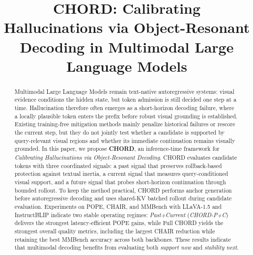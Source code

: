 \documentclass[sigconf,anonymous]{acmart}
\begin{document}
\title[CHORD]{CHORD: Calibrating Hallucinations via Object-Resonant Decoding in Multimodal Large Language Models}



\renewcommand{\shortauthors}{Anonymous Submission}

\begin{abstract}
Multimodal Large Language Models remain text-native autoregressive systems: visual evidence conditions the hidden state, but token admission is still decided one step at a time. Hallucination therefore often emerges as a short-horizon decoding failure, where a locally plausible token enters the prefix before robust visual grounding is established. Existing training-free mitigation methods mainly penalize historical failures or rescore the current step, but they do not jointly test whether a candidate is supported by query-relevant visual regions and whether its immediate continuation remains visually grounded. In this paper, we propose \textbf{CHORD}, an inference-time framework for \emph{Calibrating Hallucinations via Object-Resonant Decoding}. CHORD evaluates candidate tokens with three coordinated signals: a past signal that preserves rollback-based protection against textual inertia, a current signal that measures query-conditioned visual support, and a future signal that probes short-horizon continuation through bounded rollout. To keep the method practical, CHORD performs anchor generation before autoregressive decoding and uses shared-KV batched rollout during candidate evaluation. Experiments on POPE, CHAIR, and MMBench with LLaVA-1.5 and InstructBLIP indicate two stable operating regimes: \textit{Past+Current} (\textit{CHORD-P+C}) delivers the strongest latency-efficient POPE gains, while Full CHORD yields the strongest overall quality metrics, including the largest CHAIR reduction while retaining the best MMBench accuracy across both backbones. These results indicate that multimodal decoding benefits from evaluating both \emph{support now} and \emph{stability next}.
\end{abstract}
\end{document}
